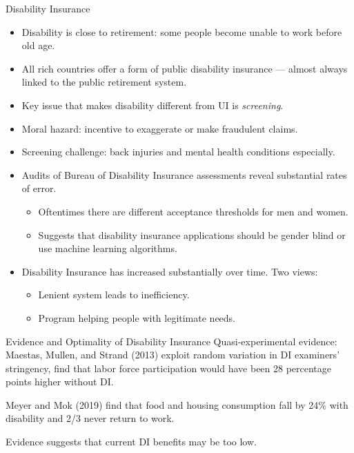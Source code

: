 \documentclass[10pt]{extarticle}
\begin{document}
  \begin{problem}{Disability Insurance}
    \begin{itemize}
      \item Disability is close to retirement: some people become unable to work before old age.
      \item All rich countries offer a form of public disability insurance --- almost always linked to the public retirement system.
      \item Key issue that makes disability different from UI is \textit{screening}.
      \item Moral hazard: incentive to exaggerate or make fraudulent claims.
      \item Screening challenge: back injuries and mental health conditions especially.
      \item Audits of Bureau of Disability Insurance assessments reveal substantial rates of error.
        \begin{itemize}
          \item Oftentimes there are different acceptance thresholds for men and women.
          \item Suggests that disability insurance applications should be gender blind or use machine learning algorithms. 
        \end{itemize}
      \item Disability Insurance has increased substantially over time. Two views:
        \begin{itemize}
          \item Lenient system leads to inefficiency.
          \item Program helping people with legitimate needs.
        \end{itemize}
    \end{itemize}
  \end{problem}
  \begin{problem}{Evidence and Optimality of Disability Insurance}
    Quasi-experimental evidence: Maestas, Mullen, and Strand (2013) exploit random variation in DI examiners' stringency, find that labor force participation would have been 28 percentage points higher without DI.\newline

    Meyer and Mok (2019) find that food and housing consumption fall by 24\% with disability and 2/3 never return to work.\newline

    Evidence suggests that current DI benefits may be too low.
  \end{problem}
\end{document}
